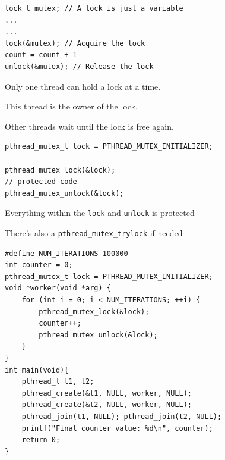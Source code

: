     \begin{slide}


	    \begin{verbatim}
lock_t mutex; // A lock is just a variable
...
...
lock(&mutex); // Acquire the lock
count = count + 1
unlock(&mutex); // Release the lock
		\end{verbatim}
		\bigskip
	  
	    Only one thread can hold a lock at a time.
		\bigskip
		
		This thread is the owner of the lock.
	    \bigskip
	  
	    Other threads wait until the lock is free again.
  
    \end{slide}

	\begin{slide}
	
		
\begin{verbatim}
pthread_mutex_t lock = PTHREAD_MUTEX_INITIALIZER;

pthread_mutex_lock(&lock);
// protected code
pthread_mutex_unlock(&lock);
\end{verbatim}
    \medskip

    Everything within the {\tt lock} and {\tt unlock} is protected
    \medskip

    There's also a {\tt pthread\_mutex\_trylock} if needed

  \end{slide}

	\begin{slide}
	
		\vspace{-5mm}
\begin{verbatim}
#define NUM_ITERATIONS 100000
int counter = 0;
pthread_mutex_t lock = PTHREAD_MUTEX_INITIALIZER;
void *worker(void *arg) {
    for (int i = 0; i < NUM_ITERATIONS; ++i) {
        pthread_mutex_lock(&lock);
        counter++;
        pthread_mutex_unlock(&lock);
    }
}
int main(void){
    pthread_t t1, t2;
    pthread_create(&t1, NULL, worker, NULL);
    pthread_create(&t2, NULL, worker, NULL);
    pthread_join(t1, NULL); pthread_join(t2, NULL);
    printf("Final counter value: %d\n", counter);
    return 0;
}
\end{verbatim}

	
	\end{slide}
	
